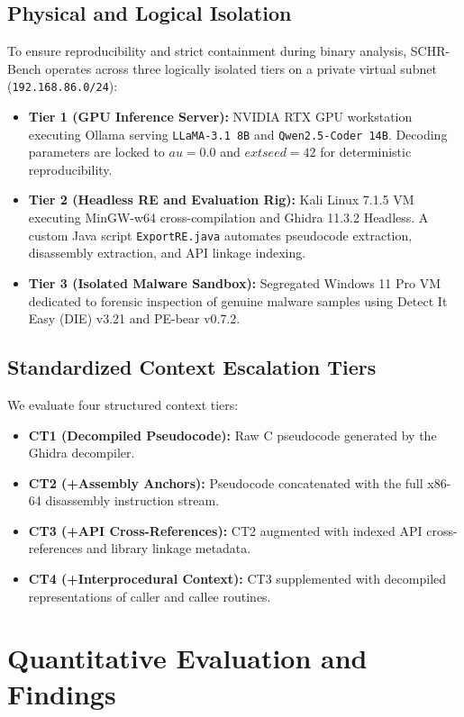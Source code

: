 \documentclass[runningheads]{llncs}
\begin{document}
\subsection{Physical and Logical Isolation}
To ensure reproducibility and strict containment during binary analysis, SCHR-Bench operates across three logically isolated tiers on a private virtual subnet (\texttt{192.168.86.0/24}):
\begin{itemize}
    \item \textbf{Tier 1 (GPU Inference Server):} NVIDIA RTX GPU workstation executing Ollama serving \texttt{LLaMA-3.1 8B} and \texttt{Qwen2.5-Coder 14B}. Decoding parameters are locked to $	au = 0.0$ and $	ext{seed} = 42$ for deterministic reproducibility.
    \item \textbf{Tier 2 (Headless RE and Evaluation Rig):} Kali Linux 7.1.5 VM executing MinGW-w64 cross-compilation and Ghidra 11.3.2 Headless. A custom Java script \texttt{ExportRE.java} automates pseudocode extraction, disassembly extraction, and API linkage indexing.
    \item \textbf{Tier 3 (Isolated Malware Sandbox):} Segregated Windows 11 Pro VM dedicated to forensic inspection of genuine malware samples using Detect It Easy (DIE) v3.21 and PE-bear v0.7.2.
\end{itemize}

\subsection{Standardized Context Escalation Tiers}
We evaluate four structured context tiers:
\begin{itemize}
    \item \textbf{CT1 (Decompiled Pseudocode):} Raw C pseudocode generated by the Ghidra decompiler.
    \item \textbf{CT2 (+Assembly Anchors):} Pseudocode concatenated with the full x86-64 disassembly instruction stream.
    \item \textbf{CT3 (+API Cross-References):} CT2 augmented with indexed API cross-references and library linkage metadata.
    \item \textbf{CT4 (+Interprocedural Context):} CT3 supplemented with decompiled representations of caller and callee routines.
\end{itemize}

\section{Quantitative Evaluation and Findings}
\end{document}
